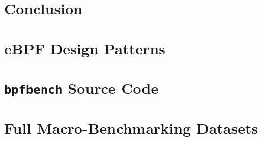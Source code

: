 \documentclass[
  12pt]{findlay}
\begin{document}
\hypertarget{conclusion}{%
\section{Conclusion}\label{conclusion}}

\clearpage
{}
\printbibliography
\clearpage

\appendix
\appendixpage

\hypertarget{ebpf-design-patterns}{%
\section{eBPF Design Patterns}\label{ebpf-design-patterns}}

\label{ebpf-design-patterns}


\FloatBarrier

\clearpage

\hypertarget{bpfbench-source-code}{%
\section{\texorpdfstring{\texttt{bpfbench} Source
Code}{bpfbench Source Code}}\label{bpfbench-source-code}}

\label{bpfbench}


\hypertarget{full-macro-benchmarking-datasets}{%
\section{Full Macro-Benchmarking
Datasets}\label{full-macro-benchmarking-datasets}}

\label{appendix_datasets}

\begingroup
\let\tablesize\scriptsize


\endgroup
\end{document}
